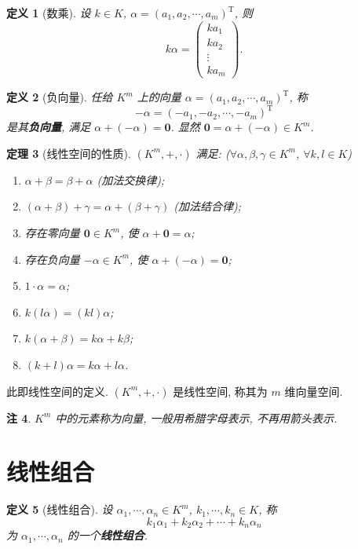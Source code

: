 \documentclass[UTF8,11pt]{ctexart}
\theoremstyle{cnthm}
\newtheorem{thm}{定理}[section]
\newtheorem{defn}[thm]{定义}
\newtheorem{rem}[thm]{注}
\begin{document}
\begin{defn}[数乘]
设 $k\in K$, $\alpha=(a_1,a_2,\cdots,a_m)^{\mathrm T}$, 则
\[
k\alpha=\begin{pmatrix}ka_1\\ka_2\\\vdots\\ka_m\end{pmatrix}.
\]
\end{defn}

\begin{defn}[负向量]
任给 $K^m$ 上的向量 $\alpha=(a_1,a_2,\cdots,a_m)^{\mathrm T}$, 称
\[
-\alpha=(-a_1,-a_2,\cdots,-a_m)^{\mathrm T}
\]
是其\textbf{负向量}, 满足 $\alpha+(-\alpha)=\mathbf{0}$. 显然 $\mathbf{0}=\alpha+(-\alpha)\in K^m$.
\end{defn}

\begin{thm}[线性空间的性质]
$(K^m,+,{\cdot})$ 满足: ($\forall\alpha,\beta,\gamma\in K^m$, $\forall k,l\in K$)
\begin{enumerate}
\item $\alpha+\beta=\beta+\alpha$ (加法交换律);
\item $(\alpha+\beta)+\gamma=\alpha+(\beta+\gamma)$ (加法结合律);
\item 存在零向量 $\mathbf{0}\in K^m$, 使 $\alpha+\mathbf{0}=\alpha$;
\item 存在负向量 $-\alpha\in K^m$, 使 $\alpha+(-\alpha)=\mathbf{0}$;
\item $1\cdot\alpha=\alpha$;
\item $k(l\alpha)=(kl)\alpha$;
\item $k(\alpha+\beta)=k\alpha+k\beta$;
\item $(k+l)\alpha=k\alpha+l\alpha$.
\end{enumerate}
\end{thm}

此即线性空间的定义. $(K^m,+,{\cdot})$ 是线性空间, 称其为 $m$ 维向量空间.

\begin{rem}
$K^m$ 中的元素称为向量, 一般用希腊字母表示, 不再用箭头表示.
\end{rem}

\section{线性组合}

\begin{defn}[线性组合]
设 $\alpha_1,\cdots,\alpha_n\in K^m$, $k_1,\cdots,k_n\in K$, 称
\[
k_1\alpha_1+k_2\alpha_2+\cdots+k_n\alpha_n
\]
为 $\alpha_1,\cdots,\alpha_n$ 的一个\textbf{线性组合}.
\end{defn}
\end{document}
